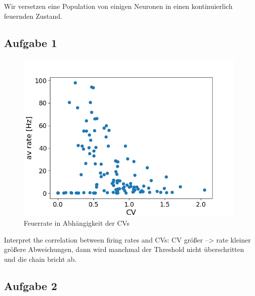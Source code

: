 \documentclass[10pt,a4paper]{scrartcl}
\begin{document}
Wir versetzen eine Population von einigen Neuronen in einen kontinuierlich feuernden Zustand. 

\subsection{Aufgabe 1}
\begin{figure} [ht]
\begin{center}
\label{fig:abb4}
\caption{Feuerrate in Abhängigkeit der CVs}
\includegraphics[scale=0.45]{pictures/decorr_rate_over_cv.png}
\end{center}
\end{figure}

Interpret the correlation between firing rates and CVs:
CV größer --> rate kleiner
größere Abweichungen, dann wird manchmal der Threshold nicht überschritten und die chain bricht ab.



\subsection{Aufgabe 2}
\end{document}

